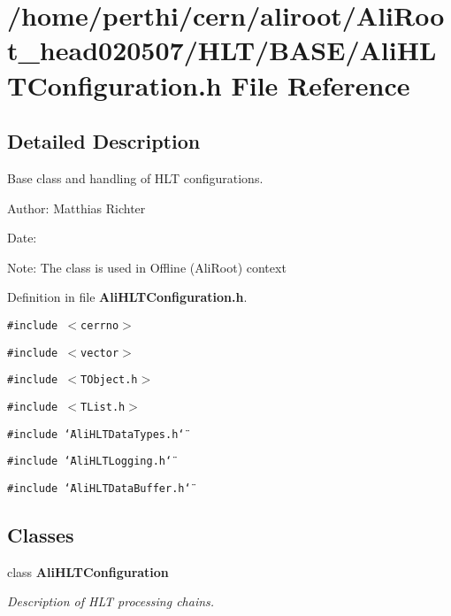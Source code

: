 \section{/home/perthi/cern/aliroot/Ali\-Root\_\-head020507/HLT/BASE/Ali\-HLTConfiguration.h File Reference}
\label{AliHLTConfiguration_8h}


\subsection{Detailed Description}
Base class and handling of HLT configurations. 

\begin{Desc}
\item[Author:]Matthias Richter \end{Desc}
\begin{Desc}
\item[Date:]\end{Desc}
\begin{Desc}
\item[Note:]The class is used in Offline (Ali\-Root) context\end{Desc}


Definition in file {\bf Ali\-HLTConfiguration.h}.

{\tt \#include $<$cerrno$>$}\par
{\tt \#include $<$vector$>$}\par
{\tt \#include $<$TObject.h$>$}\par
{\tt \#include $<$TList.h$>$}\par
{\tt \#include \char`\"{}Ali\-HLTData\-Types.h\char`\"{}}\par
{\tt \#include \char`\"{}Ali\-HLTLogging.h\char`\"{}}\par
{\tt \#include \char`\"{}Ali\-HLTData\-Buffer.h\char`\"{}}\par
\subsection*{Classes}
\begin{CompactItemize}
\item 
class {\bf Ali\-HLTConfiguration}
\begin{CompactList}\small\item\em Description of HLT processing chains. \item\end{CompactList}\end{CompactItemize}
